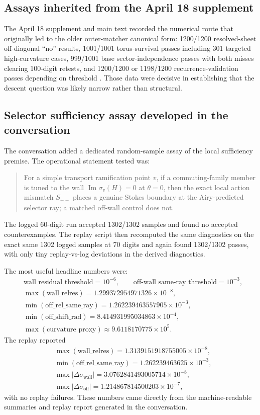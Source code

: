 \documentclass[11pt]{article}
\numberwithin{equation}{section}
\theoremstyle{definition}
\newcommand{\im}{\operatorname{Im}}
\begin{document}
\subsection{Assays inherited from the April 18 supplement}

The April 18 supplement and main text recorded the numerical route that originally led to the older outer-matcher canonical form: 1200/1200 resolved-sheet off-diagonal ``no'' results, 1001/1001 torus-survival passes including 301 targeted high-curvature cases, 999/1001 base sector-independence passes with both misses clearing 100-digit retests, and 1200/1200 or 1198/1200 recurrence-validation passes depending on threshold \cite{SuppApril18,MainApril18}. Those data were decisive in establishing that the descent question was likely narrow rather than structural.

\subsection{Selector sufficiency assay developed in the conversation}

The conversation added a dedicated random-sample assay of the local sufficiency premise. The operational statement tested was:
\begin{quote}\small
For a simple transport ramification point $v$, if a commuting-family member is tuned to the wall $\im\sigma_v(H)=0$ at $\theta=0$, then the exact local action mismatch $S_{+-}$ places a genuine Stokes boundary at the Airy-predicted selector ray; a matched off-wall control does not.
\end{quote}
The logged 60-digit run accepted 1302/1302 samples and found no accepted counterexamples. The replay script then recomputed the same diagnostics on the exact same 1302 logged samples at 70 digits and again found 1302/1302 passes, with only tiny replay-vs-log deviations in the derived diagnostics.

The most useful headline numbers were:
\begin{align*}
&\text{wall residual threshold}=10^{-6},\qquad \text{off-wall same-ray threshold}=10^{-3},\\
&\max(\text{wall\_relres})=1.299372954971326\times 10^{-8},\\
&\min(\text{off\_rel\_same\_ray})=1.262239463557905\times 10^{-3},\\
&\min(\text{off\_shift\_rad})=8.414931995034863\times 10^{-4},\\
&\max(\text{curvature proxy})\approx 9.6118170775\times 10^{5}.
\end{align*}
The replay reported
\begin{align*}
&\max(\text{wall\_relres})=1.3139151918755005\times 10^{-8},\\
&\min(\text{off\_rel\_same\_ray})=1.262239463625\times 10^{-3},\\
&\max|\Delta \sigma_{\mathrm{wall}}|=3.0762841493005714\times 10^{-8},\\
&\max|\Delta \sigma_{\mathrm{off}}|=1.214867814500203\times 10^{-7},
\end{align*}
with no replay failures. These numbers came directly from the machine-readable summaries and replay report generated in the conversation.
\end{document}
